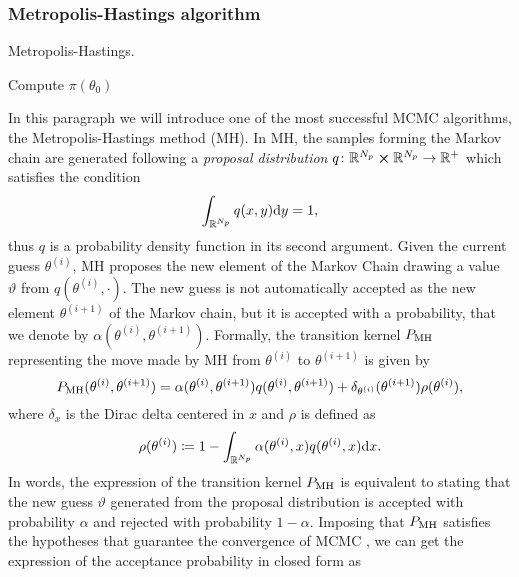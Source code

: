 \subsubsection{Metropolis-Hastings algorithm}
\begin{algorithm}[t]
	\caption{Metropolis-Hastings.}
	\label{alg:MH}
	Compute $\pi(\theta_0)$ \;
\end{algorithm}
In this paragraph we will introduce one of the most successful MCMC algorithms, the Metropolis-Hastings method (MH). In MH, the samples forming the Markov chain are generated following a \textit{proposal distribution} $q\colon \mathbb{R}^{N_p} \cross \mathbb{R}^{N_p} \to \mathbb{R}^+$ which satisfies the condition
\begin{equation}
	\int_{\mathbb{R}^{N_p}}q(x, y)\dd y = 1,
\end{equation}
thus $q$ is a probability density function in its second argument. Given the current guess $\theta^{(i)}$, MH proposes the new element of the Markov Chain drawing a value $\vartheta$ from $q(\theta^{(i)}, \cdot)$. The new guess is not automatically accepted as the new element $\theta^{(i+1)}$ of the Markov chain, but it is accepted with a probability, that we denote by $\alpha(\theta^{(i)}, \theta^{(i+1)})$. Formally, the transition kernel $P_{\mathrm{MH}}$ representing the move made by MH from $\theta^{(i)}$ to $\theta^{(i+1)}$ is given by \cite{MLR16}
\begin{equation}
	P_{\mathrm{MH}}(\theta^{(i)}, \theta^{(i+1)}) = \alpha(\theta^{(i)}, \theta^{(i+1)})q(\theta^{(i)},\theta^{(i+1)}) + \delta_{\theta^{(i)}}(\theta^{(i+1)})\rho(\theta^{(i)}),
\end{equation}
where $\delta_x$ is the Dirac delta centered in $x$ and $\rho$ is defined as
\begin{equation}
	\rho(\theta^{(i)}) \coloneqq 1 - \int_{\mathbb{R}^{N_p}}\alpha(\theta^{(i)}, x)q(\theta^{(i)}, x)\dd x.
\end{equation}
In words, the expression of the transition kernel $P_{\mathrm{MH}}$ is equivalent to stating that the new guess $\vartheta$ generated from the proposal distribution is accepted with probability $\alpha$ and rejected with probability $1 - \alpha$. Imposing that $P_{\mathrm{MH}}$ satisfies the hypotheses that guarantee the convergence of MCMC \cite{KaS05}, we can get the expression of the acceptance probability in closed form as 
